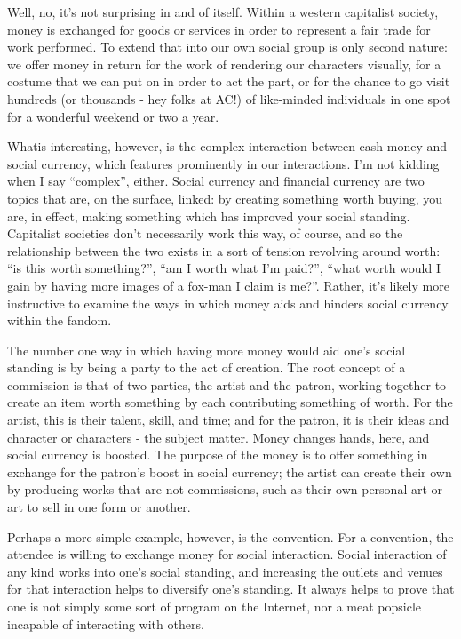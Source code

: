 Well, no, it's not surprising in and of itself. Within a western capitalist society, money is exchanged for goods or services in order to represent a fair trade for work performed. To extend that into our own social group is only second nature: we offer money in return for the work of rendering our characters visually, for a costume that we can put on in order to act the part, or for the chance to go visit hundreds (or thousands - hey folks at AC!) of like-minded individuals in one spot for a wonderful weekend or two a year.

Whatis interesting, however, is the complex interaction between cash-money and social currency, which features prominently in our interactions. I'm not kidding when I say ``complex'', either. Social currency and financial currency are two topics that are, on the surface, linked: by creating something worth buying, you are, in effect, making something which has improved your social standing. Capitalist societies don't necessarily work this way, of course, and so the relationship between the two exists in a sort of tension revolving around worth: ``is this worth something?'', ``am I worth what I'm paid?'', ``what worth would I gain by having more images of a fox-man I claim is me?''. Rather, it's likely more instructive to examine the ways in which money aids and hinders social currency within the fandom.

The number one way in which having more money would aid one's social standing is by being a party to the act of creation. The root concept of a commission is that of two parties, the artist and the patron, working together to create an item worth something by each contributing something of worth. For the artist, this is their talent, skill, and time; and for the patron, it is their ideas and character or characters - the subject matter. Money changes hands, here, and social currency is boosted. The purpose of the money is to offer something in exchange for the patron's boost in social currency; the artist can create their own by producing works that are not commissions, such as their own personal art or art to sell in one form or another.

Perhaps a more simple example, however, is the convention. For a convention, the attendee is willing to exchange money for social interaction. Social interaction of any kind works into one's social standing, and increasing the outlets and venues for that interaction helps to diversify one's standing. It always helps to prove that one is not simply some sort of program on the Internet, nor a meat popsicle incapable of interacting with others.


